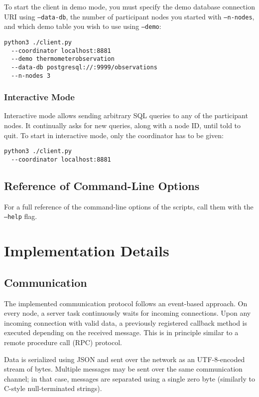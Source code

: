 \documentclass{article}
\begin{document}
\begin{multicols}{2}
To start the client in demo mode, you must specify the demo database connection URI using 
\texttt{--data-db}, the number of
participant nodes you started with \texttt{--n-nodes}, and
which demo table you wish to use using \texttt{--demo}:

\begin{verbatim}
python3 ./client.py
  --coordinator localhost:8881
  --demo thermometerobservation
  --data-db postgresql://:9999/observations
  --n-nodes 3
\end{verbatim}

\subsubsection{Interactive Mode}

Interactive mode allows sending arbitrary SQL queries to any
of the participant nodes. It continually asks for new
queries, along with a node ID, until told to quit. To start
in interactive mode, only the coordinator has to be given:

\begin{verbatim}
python3 ./client.py
  --coordinator localhost:8881
\end{verbatim}

\subsection{Reference of Command-Line Options}

For a full reference of the command-line options of the
scripts, call them with the \texttt{--help} flag.



\section{Implementation Details}

\subsection{Communication}
\label{sec:comm}

The implemented communication protocol follows an 
event-based approach. On every node, a server task 
continuously
waits for incoming connections. Upon any incoming
connection with valid data, a previously registered
callback method is executed depending on the received
message. This is in principle similar to a 
remote procedure call (RPC) protocol.

Data is serialized using JSON and sent over the network
as an UTF-8-encoded stream of bytes. Multiple messages may
be sent over the same communication channel; in that case,
messages are separated using a single zero byte (similarly
to C-style null-terminated strings).


\end{multicols}
\end{document}
